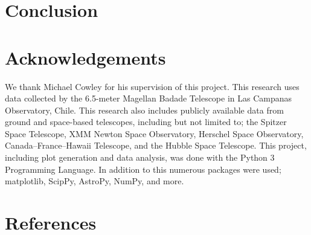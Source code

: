 \documentclass[11pt]{iopart}
\begin{document}
\section{Conclusion}

\newpage
\section*{Acknowledgements}
We thank Michael Cowley for his supervision of this project. This research uses data collected by the 6.5-meter Magellan Badade Telescope in Las Campanas Observatory, Chile. This research also includes publicly available data from ground and space-based telescopes, including but not limited to; the Spitzer Space Telescope, XMM Newton Space Observatory, Herschel Space Observatory, Canada–France–Hawaii Telescope, and the Hubble Space Telescope. This project, including plot generation and data analysis, was done with the Python 3 Programming Language. In addition to this numerous packages were used; matplotlib, ScipPy, AstroPy, NumPy, and more. 
\section*{References}



\end{document}
